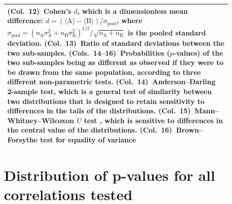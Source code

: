\begin{table}
\begin{tabular}{p{0.9\linewidth}}
    (Col.~12)~Cohen's \(d\), which is a dimensionless mean difference: \(d = (\langle \text{A} \rangle - \langle \text{B} \rangle) / \sigma_{\text{pool}} \), where \(\sigma_{\text{pool}} = (n_{\text{A}} \sigma_{\text{A}}^2 + n_{\text{B}} \sigma_{\text{B}}^2)^{1/2} / \sqrt{n_{\text{A}} + n_{\text{B}}}\) is the pooled standard deviation.
    (Col.~13)~Ratio of standard deviations between the two sub-samples.
    (Cols.~14--16)~Probabilities (\(p\)-values) of the two sub-samples being as different as observed if they were to be drawn from the same population, according to three different non-parametric tests.
    (Col.~14)~Anderson--Darling 2-sample test, which is a general test of similarity between two distributions that is designed to retain sensitivity to differences in the tails of the distributions.
    (Col.~15)~Mann--Whitney--Wilcoxon \(U\) test \citep{Mann:1947a}, which is sensitive to differences in the central value of the distributions.
    (Col.~16)~Brown--Forsythe test for equality of variance \citep{Brown:1974a}
    \\
    \bottomrule
  \end{tabular}
\end{table}

\addtocounter{section}{-1}

\section{Distribution of p-values for all correlations tested}
\label{sec:distr-p-values}
\addtocounter{table}{1}


